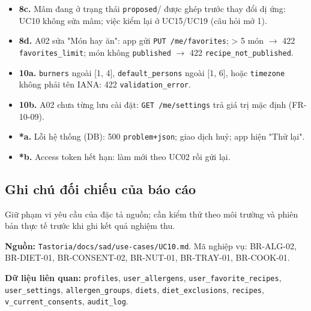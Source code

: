 \begin{itemize}
\item \textbf{8c.} Mâm đang ở trạng thái {\small\texttt{proposed}}/ được ghép trước thay đổi dị ứng: UC10 không sửa mâm; việc kiểm lại ở UC15/\allowbreak{}UC19 (câu hỏi mở 1).
\item \textbf{8d.} A02 sửa "Món hay ăn": app gửi {\small\texttt{PUT /\allowbreak{}\allowbreak{}me/\allowbreak{}\allowbreak{}favorites}}; > 5 món \ensuremath{\rightarrow} 422 {\small\texttt{favorites\_\allowbreak{}\allowbreak{}limit}}; món không {\small\texttt{published}} \ensuremath{\rightarrow} 422 {\small\texttt{recipe\_\allowbreak{}\allowbreak{}not\_\allowbreak{}\allowbreak{}published}}.
\item \textbf{10a.} {\small\texttt{burners}} ngoài [1, 4], {\small\texttt{default\_\allowbreak{}\allowbreak{}persons}} ngoài [1, 6], hoặc {\small\texttt{timezone}} không phải tên IANA: 422 {\small\texttt{validation\_\allowbreak{}\allowbreak{}error}}.
\item \textbf{10b.} A02 chưa từng lưu cài đặt: {\small\texttt{GET /\allowbreak{}\allowbreak{}me/\allowbreak{}\allowbreak{}settings}} trả giá trị mặc định (FR-\allowbreak{}10-\allowbreak{}09).
\item \textbf{*a.} Lỗi hệ thống (DB): 500 {\small\texttt{problem+json}}; giao dịch huỷ; app hiện "Thử lại".
\item \textbf{*b.} Access token hết hạn: làm mới theo UC02 rồi gửi lại.
\end{itemize}
\subsection{Ghi chú đối chiếu của báo cáo}
Giữ phạm vi yêu cầu của đặc tả nguồn; cần kiểm thử theo môi trường và phiên bản thực tế trước khi ghi kết quả nghiệm thu.

\textbf{Nguồn:} {\small\texttt{Tastoria/\allowbreak{}\allowbreak{}docs/\allowbreak{}\allowbreak{}sad/\allowbreak{}\allowbreak{}use-\allowbreak{}cases/\allowbreak{}\allowbreak{}UC10.\allowbreak{}md}}. Mã nghiệp vụ: BR-\allowbreak{}ALG-\allowbreak{}02, BR-\allowbreak{}DIET-\allowbreak{}01, BR-\allowbreak{}CONSENT-\allowbreak{}02, BR-\allowbreak{}NUT-\allowbreak{}01, BR-\allowbreak{}TRAY-\allowbreak{}01, BR-\allowbreak{}COOK-\allowbreak{}01.

\textbf{Dữ liệu liên quan:} {\small\texttt{profiles}}, {\small\texttt{user\_\allowbreak{}\allowbreak{}allergens}}, {\small\texttt{user\_\allowbreak{}\allowbreak{}favorite\_\allowbreak{}\allowbreak{}recipes}}, {\small\texttt{user\_\allowbreak{}\allowbreak{}settings}}, {\small\texttt{allergen\_\allowbreak{}\allowbreak{}groups}}, {\small\texttt{diets}}, {\small\texttt{diet\_\allowbreak{}\allowbreak{}exclusions}}, {\small\texttt{recipes}}, {\small\texttt{v\_\allowbreak{}\allowbreak{}current\_\allowbreak{}\allowbreak{}consents}}, {\small\texttt{audit\_\allowbreak{}\allowbreak{}log}}.

